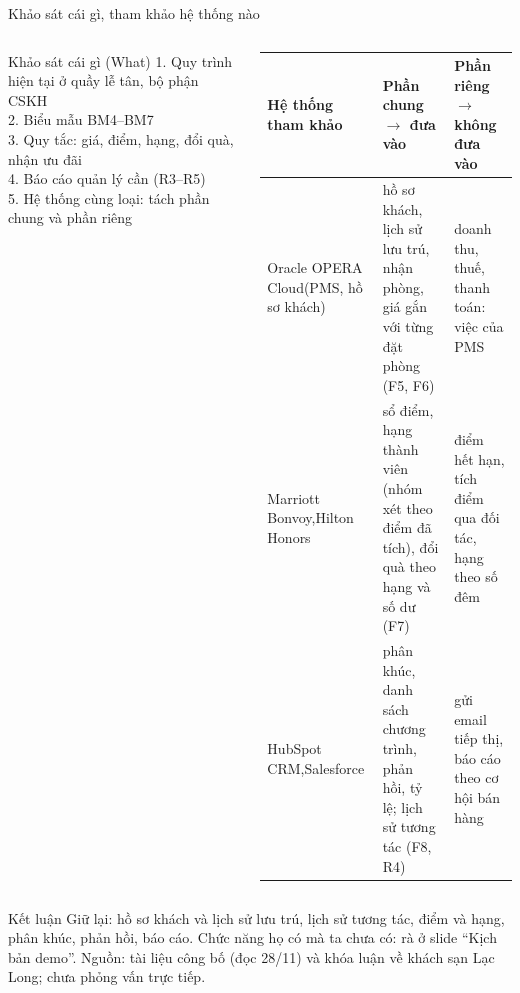 \begin{frame}{Khảo sát cái gì, tham khảo hệ thống nào \TB}
\begin{columns}[T]
\begin{block}{Khảo sát cái gì (What)}
\scriptsize
1. Quy trình hiện tại ở quầy lễ tân, bộ phận CSKH\\[0.6mm]
2. Biểu mẫu BM4--BM7\\[0.6mm]
3. Quy tắc: giá, điểm, hạng, đổi quà, nhận ưu đãi\\[0.6mm]
4. Báo cáo quản lý cần (R3--R5)\\[0.6mm]
5. Hệ thống cùng loại: tách phần chung và phần riêng
\end{block}
\scriptsize
\begin{tabularx}{\linewidth}{@{}L{2.3cm}YY@{}}
\toprule
\textbf{Hệ thống tham khảo} & \textbf{Phần chung $\to$ đưa vào} & \textbf{Phần riêng $\to$ không đưa vào} \\
\midrule
Oracle OPERA Cloud\newline(PMS, hồ sơ khách) & hồ sơ khách, lịch sử lưu trú, nhận phòng, giá gắn với từng đặt phòng (F5, F6) & doanh thu, thuế, thanh toán: việc của PMS \\ \addlinespace
Marriott Bonvoy,\newline Hilton Honors & sổ điểm, hạng thành viên (nhóm xét theo điểm đã tích), đổi quà theo hạng và số dư (F7) & điểm hết hạn, tích điểm qua đối tác, hạng theo số đêm \\ \addlinespace
HubSpot CRM,\newline Salesforce & phân khúc, danh sách chương trình, phản hồi, tỷ lệ; lịch sử tương tác (F8, R4) & gửi email tiếp thị, báo cáo theo cơ hội bán hàng \\
\bottomrule
\end{tabularx}
\end{columns}

\vspace{3mm}
\begin{alertblock}{Kết luận}
\scriptsize Giữ lại: hồ sơ khách và lịch sử lưu trú, lịch sử tương tác, điểm và hạng, phân khúc, phản hồi, báo cáo. Chức năng họ có mà ta chưa có: rà ở slide ``Kịch bản demo''. Nguồn: tài liệu công bố (đọc 28/11) và khóa luận về khách sạn Lạc Long; chưa phỏng vấn trực tiếp.
\end{alertblock}
\end{frame}

